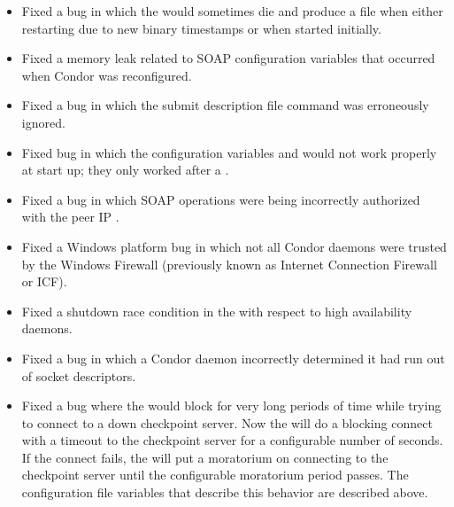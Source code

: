 \begin{itemize}
\item Fixed a bug in which the  would sometimes die and produce
a  file when either restarting due to new
binary timestamps or when started initially.

\item Fixed a memory leak related to SOAP configuration variables
that occurred when Condor was reconfigured.

\item Fixed a bug in which the submit description file command
 was erroneously ignored.

\item Fixed bug in which the configuration variables
 and 
would not work properly at start up; they only worked after a .

\item Fixed a bug in which SOAP operations were being incorrectly authorized
with the peer IP .

\item Fixed a Windows platform bug in which not all Condor daemons were trusted
by the Windows Firewall
(previously known as Internet Connection Firewall or ICF).


\item Fixed a shutdown race condition in the  with respect to
high availability daemons.

\item Fixed a bug in which a Condor daemon incorrectly determined it had
run out of socket descriptors.

\item Fixed a bug where the  would block for very long
periods of time while trying to connect to a down checkpoint server. Now
the  will do a blocking connect with a timeout to the
checkpoint server for a configurable number of seconds. If the connect
fails, the  will put a moratorium on connecting to the
checkpoint server until the configurable moratorium period passes. The
configuration file variables that describe this behavior are described
above.


\end{itemize}
